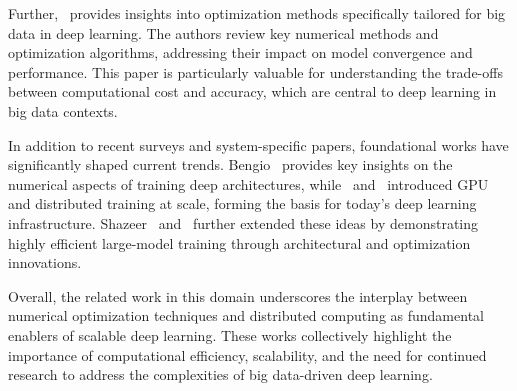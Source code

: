 Further,~\cite{ben2019demystifying} provides insights into optimization methods specifically tailored for big data in deep learning. The authors review key numerical methods and optimization algorithms, addressing their impact on model convergence and performance. This paper is particularly valuable for understanding the trade-offs between computational cost and accuracy, which are central to deep learning in big data contexts.

In addition to recent surveys and system-specific papers, foundational works have significantly shaped current trends. 
Bengio~\cite{bengio2012practical} provides key insights on the numerical aspects of training deep architectures, while~\cite{krizhevsky2012imagenet} 
and~\cite{dean2012large} introduced GPU and distributed training at scale, forming the basis for today's deep learning infrastructure.
 Shazeer~\cite{shazeer2017outrageously} and~\cite{you2019large} further extended these ideas by demonstrating highly efficient large-model training 
 through architectural and optimization innovations.


Overall, the related work in this domain underscores the interplay between numerical optimization techniques and distributed computing as fundamental enablers of scalable deep learning. These works collectively highlight the importance of computational efficiency, scalability, and the need for continued research to address the complexities of big data-driven deep learning.


